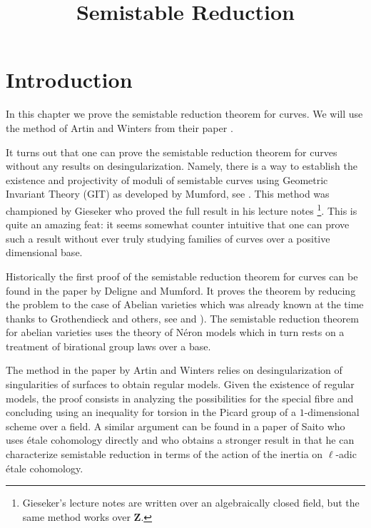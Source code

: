

%


\title{Semistable Reduction}


\maketitle

\label{section-phantom}

\tableofcontents

\section{Introduction}
\label{section-introduction}

\noindent
In this chapter we prove the semistable reduction theorem for curves.
We will use the method of Artin and Winters from their paper
\cite{Artin-Winters}.

\medskip\noindent
It turns out that one can prove the semistable reduction theorem
for curves without any results on desingularization. Namely, there
is a way to establish the existence and projectivity of moduli
of semistable curves using Geometric Invariant Theory (GIT)
as developed by Mumford, see \cite{GIT}. This method was
championed by Gieseker who proved the full result in his
lecture notes \cite{Gieseker}\footnote{Gieseker's lecture notes
are written over an algebraically closed field, but the same method
works over $\mathbf{Z}$.}. This is quite an amazing
feat: it seems somewhat counter intuitive that one can
prove such a result without ever truly studying families of curves over
a positive dimensional base.

\medskip\noindent
Historically the first proof of the semistable reduction theorem
for curves can be found in the paper \cite{DM} by Deligne and Mumford.
It proves the theorem by reducing the problem to the case of
Abelian varieties which was already known at the time thanks
to Grothendieck and others, see \cite{SGA7-I} and \cite{SGA7-II}).
The semistable reduction theorem for abelian varieties uses the theory
of N\'eron models which in turn rests on a treatment of birational
group laws over a base.

\medskip\noindent
The method in the paper by Artin and Winters relies on desingularization
of singularities of surfaces to obtain regular models. Given the existence
of regular models, the proof consists in analyzing the
possibilities for the special fibre and concluding using an inequality
for torsion in the Picard group of a $1$-dimensional scheme over a field.
A similar argument can be found in a paper \cite{Saito} of Saito who uses
\'etale cohomology directly and who obtains a stronger result in that
he can characterize semistable reduction in terms of the action of
the inertia on $\ell$-adic \'etale cohomology.

